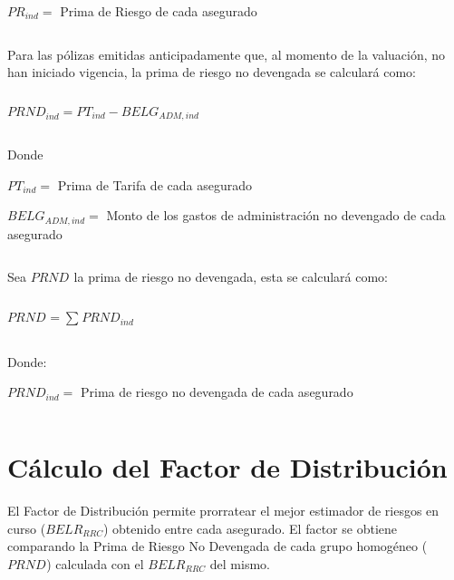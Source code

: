 \documentclass[11pt,twoside,openright,spanish]{report}
\numberwithin{equation}{chapter}
\numberwithin{figure}{chapter}
\numberwithin{table}{chapter}
\begin{document}
	$PR_{ind}=$ Prima de Riesgo de cada asegurado 
	
	 

$ $

 
	
	Para las pólizas emitidas anticipadamente que, al momento de la valuación, no han iniciado vigencia, la prima de riesgo no devengada se calculará como:
	
	 

$ $

 
	
		{\centering
		${PRND}_{ind}^{}={{PT}_{ind}-BELG_{ADM,ind}}$
		\noindent
		
	}	
	
	
	 

$ $

 
	
	Donde
	
	 
	
	$PT_{ind}=$ Prima de Tarifa de cada asegurado
	
	$BELG_{ADM,ind}=$ Monto de los gastos de administración no devengado de cada asegurado
	
	 

$ $

 
	
	Sea $PRND_{}$ la prima de riesgo no devengada, esta se calculará como:
	
	 

$ $

 
	
	
		{\centering
	$PRND_{}={\sum _{}^{}PRND_{ind}^{}}$
	
		\noindent
	
}	

	
	 

$ $

 
	
	Donde:
	
	 
	
	$PRND_{ind}=$ Prima de riesgo no devengada de cada asegurado
	
	 

$ $

 
	
	\section{Cálculo del Factor de Distribución}
	
	 
	
	El Factor de Distribución permite prorratear el mejor estimador de riesgos en curso ($BELR_{RRC}$) obtenido entre cada asegurado. El factor se obtiene comparando la Prima de Riesgo No Devengada de cada grupo homogéneo ($PRND_{}$) calculada con el $BELR_{RRC}$ del mismo.
	
\end{document}
